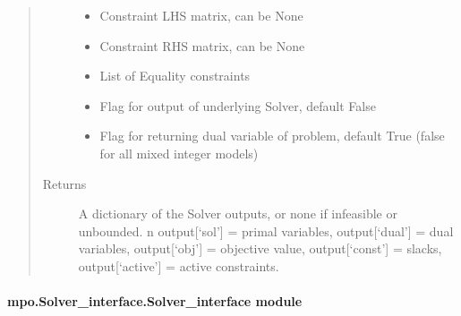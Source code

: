 \documentclass[letterpaper,10pt,english]{sphinxmanual}
\begin{document}
\begin{fulllineitems}
\begin{quote}
\begin{description}
\begin{itemize}
\item {} 
\sphinxAtStartPar
{} \textendash{} Constraint LHS matrix, can be None

\item {} 
\sphinxAtStartPar
{} \textendash{} Constraint RHS matrix, can be None

\item {} 
\sphinxAtStartPar
{} \textendash{} List of Equality constraints

\item {} 
\sphinxAtStartPar
{} \textendash{} Flag for output of underlying Solver, default False

\item {} 
\sphinxAtStartPar
{} \textendash{} Flag for returning dual variable of problem, default True (false for all mixed integer models)

\end{itemize}

\item[{Returns}] \leavevmode
\sphinxAtStartPar
A dictionary of the Solver outputs, or none if infeasible or unbounded. n output{[}‘sol’{]} = primal variables, output{[}‘dual’{]} = dual variables, output{[}‘obj’{]} = objective value, output{[}‘const’{]} = slacks, output{[}‘active’{]} = active constraints.

\end{description}\end{quote}

\end{fulllineitems}



\paragraph{mpo.Solver\_interface.Solver\_interface module}
\label{\detokenize{mpo.solver_interface:module-mpo.solver_interface.solver_interface}}\label{\detokenize{mpo.solver_interface:mpo-Solver-interface-Solver-interface-module}}
\end{document}
